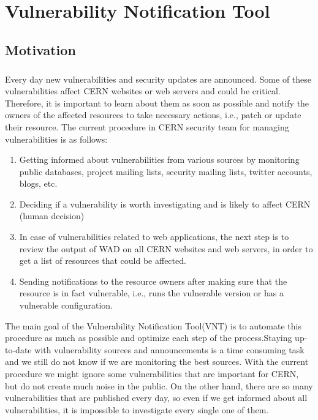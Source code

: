 \chapter{Vulnerability Notification Tool}
\label{chap5-vulnerability-notification-tool}
\thispagestyle{empty}

\section{Motivation}

\paragraph{}
Every day new vulnerabilities and security updates are announced. Some of these vulnerabilities affect CERN websites or web servers and could be critical. Therefore, it is important to learn about them as soon as possible and notify the owners of the affected resources to take necessary actions, i.e., patch or update their resource. The current procedure in CERN security team for managing vulnerabilities is as follows:
\begin{enumerate}
\item Getting informed about vulnerabilities from various sources by monitoring public databases, project mailing lists, security mailing lists, twitter accounts, blogs, etc.
\item Deciding if a vulnerability is worth investigating and is likely to affect CERN (human decision)
\item In case of vulnerabilities related to web applications, the next step is to review the output of WAD on all CERN websites and web servers, in order to get a list of resources that could be affected.
\item Sending notifications to the resource owners after making sure that the resource is in fact vulnerable, i.e., runs the vulnerable version or has a vulnerable configuration.
\end{enumerate}

The main goal of the Vulnerability Notification Tool(VNT) is to automate this procedure as much as possible and optimize each step of the process.Staying up-to-date with vulnerability sources and announcements is a time consuming task and we still do not know if we are monitoring the best sources. With the current procedure we might ignore some vulnerabilities that are important for CERN, but do not create much noise in the public. 
On the other hand, there are so many vulnerabilities that are published every day, so even if we get informed about all vulnerabilities, it is impossible to investigate every single one of them. 

